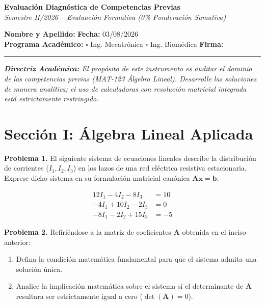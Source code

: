 \documentclass[11pt, a4paper]{article}
\begin{document}
\begin{center}
    \Large \textbf{Evaluación Diagnóstica de Competencias Previas} \\
    \vspace{0.2cm}
    \normalsize \textit{Semestre II/2026 -- Evaluación Formativa (0\% Ponderación Sumativa)}
\end{center}

\vspace{0.5cm}
\noindent
\textbf{Nombre y Apellido:} \underline{\hspace{7.5cm}} \hfill \textbf{Fecha:} 03/08/2026 \\
\textbf{Programa Académico:} $\square$ Ing. Mecatrónica \quad $\square$ Ing. Biomédica \hfill \textbf{Firma:} \underline{\hspace{2.5cm}}

\vspace{0.3cm}
\hrule
\vspace{0.5cm}

\noindent \textit{\textbf{Directriz Académica:} El propósito de este instrumento es auditar el dominio de las competencias previas (MAT-123 Álgebra Lineal). Desarrolle las soluciones de manera analítica; el uso de calculadoras con resolución matricial integrada está estrictamente restringido.}

\vspace{0.5cm}

\section*{Sección I: Álgebra Lineal Aplicada}

\textbf{Problema 1.} El siguiente sistema de ecuaciones lineales describe la distribución de corrientes ($I_1, I_2, I_3$) en los lazos de una red eléctrica resistiva estacionaria. Exprese dicho sistema en su formulación matricial canónica $\mathbf{A}\mathbf{x} = \mathbf{b}$.

\begin{align*}
    12 I_1 - 4 I_2 - 8 I_3 &= 10 \\
    -4 I_1 + 10 I_2 - 2 I_3 &= 0 \\
    -8 I_1 - 2 I_2 + 15 I_3 &= -5
\end{align*}

\vspace{2.5cm}

\textbf{Problema 2.} Refiriéndose a la matriz de coeficientes $\mathbf{A}$ obtenida en el inciso anterior:
\begin{enumerate}
    \item Defina la condición matemática fundamental para que el sistema admita una solución única.
    \item Analice la implicación matemática sobre el sistema si el determinante de $\mathbf{A}$ resultara ser estrictamente igual a cero ($\det(\mathbf{A}) = 0$).
\end{enumerate}
\end{document}
